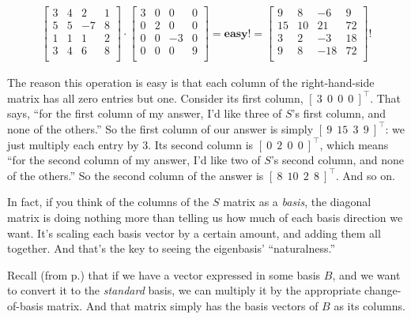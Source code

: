 \vspace{-.25in}
\begin{align*}
\begin{bmatrix}
3 & 4 & 2 & 1 \\
5 & 5 & -7 & 8 \\
1 & 1 & 1 & 2 \\
3 & 4 & 6 & 8 \\
\end{bmatrix} \cdot
\begin{bmatrix}
3 & 0 & 0 & 0 \\
0 & 2 & 0 & 0 \\
0 & 0 & -3 & 0 \\
0 & 0 & 0 & 9 \\
\end{bmatrix} = \textbf{easy!} =
\begin{bmatrix}
9 & 8 & -6 & 9 \\
15 & 10 & 21 & 72 \\
3 & 2 & -3 & 18 \\
9 & 8 & -18 & 72 \\
\end{bmatrix}\textrm{!}
\end{align*}
\vspace{-.15in}

The reason this operation is easy is that each column of the right-hand-side
matrix has all zero entries but one. Consider its first column, $[\ 3\ \ 0\ \
0\ \ 0\ ]^\intercal$. That says, ``for the first column of my answer, I'd like
three of $S$'s first column, and none of the others.'' So the first column of
our answer is simply $[\ 9\ \ 15\ \ 3\ \ 9\ ]^\intercal$: we just multiply each
entry by 3. Its second column is $[\ 0\ \ 2\ \ 0\ \ 0\ ]^\intercal$, which
means ``for the second column of my answer, I'd like two of $S$'s second
column, and none of the others.'' So the second column of the answer is $[\ 8\
\ 10\ \ 2\ \ 8\ ]^\intercal$. And so on.

In fact, if you think of the columns of the $S$ matrix as a \textit{basis}, the
diagonal matrix is doing nothing more than telling us how much of each basis
direction we want. It's scaling each basis vector by a certain amount, and
adding them all together. And that's the key to seeing the eigenbasis'
``naturalness.''


Recall (from p.\pageref{changeOfBasisMatrix}) that if we have a vector
expressed in some basis $B$, and we want to convert it to the \textit{standard}
basis, we can multiply it by the appropriate change-of-basis matrix. And that
matrix simply has the basis vectors of $B$ as its columns.

